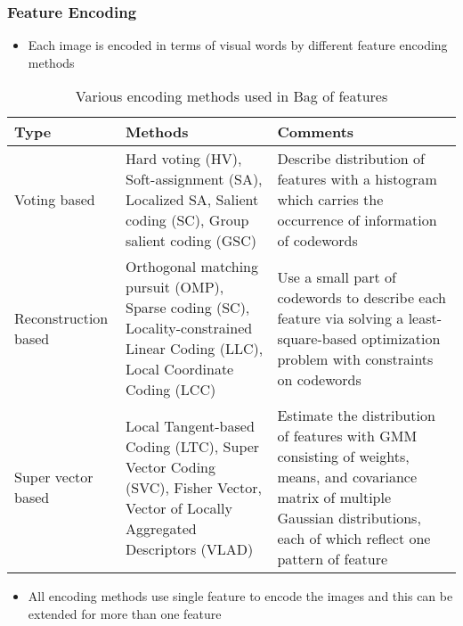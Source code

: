 \documentclass [9pt,times] {beamer}
\begin{document}
\begin{frame}\frametitle{Feature Encoding}
\begin{itemize}
\item Each image is encoded in terms of visual words  by different \textcolor[rgb]{0.00,0.00,1.00}{feature encoding methods}

\end{itemize}
\begin{block}{}
\begin{table}[!t]

\renewcommand{\arraystretch}{1.5}
\caption{Various encoding methods used in Bag of features \cite{huang2014, peng2016}}
\label{Tab:encoding}
\centering
\scriptsize{
\begin{tabular}{p{1.3cm}|p{3cm}|p{4cm}}
	 \hline
	\textbf{Type} &\textbf{Methods}  &  \textbf{Comments}\\
	 \hline 
	Voting based & Hard voting (HV), Soft-assignment (SA), Localized SA, Salient coding (SC), Group salient coding (GSC) & Describe distribution of features with a histogram which carries the occurrence of information of codewords\\

Reconstruction based & Orthogonal matching pursuit (OMP), Sparse coding (SC), Locality-constrained Linear Coding (LLC), Local Coordinate Coding (LCC) &  Use a small part of codewords to describe each feature via solving a least-square-based optimization problem with constraints on codewords \\

Super vector based & Local Tangent-based Coding (LTC), Super Vector Coding (SVC), Fisher Vector, Vector of Locally Aggregated Descriptors (VLAD) & Estimate the distribution of features with GMM consisting of weights, means, and covariance matrix of multiple Gaussian distributions, each of which reflect one pattern of feature \\
\hline


\end{tabular}
}
\end{table}
\end{block}

\begin{itemize}
\item  All encoding methods use single feature to encode the images and this can be extended for more than one feature

\end{itemize}

\end{frame}
\end{document}
